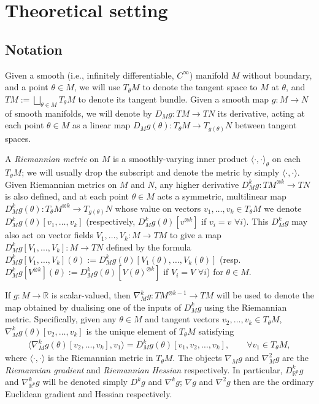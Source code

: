 \documentclass{article}
\newcommand{\RB}{\mathbb{R}}
\theoremstyle{plain}
\theoremstyle{definition}
\theoremstyle{remark}
\begin{document}
\section{Theoretical setting}

\subsection{Notation} 

Given a smooth (i.e., infinitely differentiable, $C^{\infty}$) manifold $M$ without boundary, and a point $\theta\in M$, we will use $T_{\theta}M$ to denote the tangent space to $M$ at $\theta$, and $TM:=\bigsqcup_{\theta\in M}T_{\theta}M$ to denote its tangent bundle. Given a smooth map $g:M\rightarrow N$ of smooth manifolds, we will denote by $D_Mg:TM\rightarrow TN$ its derivative, acting at each point $\theta\in M$ as a linear map $D_Mg(\theta):T_{\theta}M\rightarrow T_{g(\theta)}N$ between tangent spaces.

A \emph{Riemannian metric} on $M$ is a smoothly-varying inner product $\langle\cdot,\cdot\rangle_{\theta}$ on each $T_{\theta}M$; we will usually drop the subscript and denote the metric by simply $\langle\cdot,\cdot\rangle$. Given Riemannian metrics on $M$ and $N$, any higher derivative $D^k_Mg:TM^{\otimes k}\rightarrow TN$ is also defined, and at each point $\theta\in M$ acts a symmetric, multilinear map $D^k_Mg(\theta):T_{\theta}M^{\otimes k}\rightarrow T_{g(\theta)}N$ whose value on vectors $v_1,\dots,v_k\in T_{\theta}M$ we denote $D^k_Mg(\theta)[v_1,\dots,v_k]$ (respectively, $D^k_Mg(\theta)[v^{\otimes k}]$ if $v_i=v\,\,\forall i$). This $D^k_Mg$ may also act on vector fields $V_1,\dots,V_k:M\rightarrow TM$ to give a map $D^k_Mg[V_1,\dots,V_k]:M\rightarrow TN$ defined by the formula $D^k_Mg[V_1,\dots,V_k](\theta):=D^k_Mg(\theta)[V_1(\theta),\dots,V_k(\theta)]$ (resp. $D^k_Mg[V^{\otimes k}](\theta):=D^k_Mg(\theta)[V(\theta)^{\otimes k}]$ if $V_i=V\,\,\forall i$) for $\theta\in M$.

If $g:M\rightarrow\RB$ is scalar-valued, then $\nabla^k_Mg:TM^{\otimes k-1}\rightarrow TM$ will be used to denote the map obtained by dualising one of the inputs of $D^k_Mg$ using the Riemannian metric. Specifically, given any $\theta\in M$ and tangent vectors $v_2,\dots,v_k\in T_{\theta}M$, $\nabla^k_Mg(\theta)[v_2,\dots,v_k]$ is the unique element of $T_{\theta}M$ satisfying
\begin{align}
    \langle \nabla^k_Mg(\theta)[v_2,\dots,v_k],v_1\rangle = D^k_Mg(\theta)[v_1,v_2,\dots,v_k],\qquad \forall v_1\in T_{\theta}M,\label{eq:dualise}
\end{align}
where $\langle\cdot,\cdot\rangle$ is the Riemannian metric in $T_{\theta}M$. The objects $\nabla_Mg$ and $\nabla^2_Mg$ are the \emph{Riemannian gradient} and \emph{Riemannian Hessian} respectively. In particular, $D^k_{\RB^p}g$ and $\nabla^k_{\RB^p}g$ will be denoted simply $D^kg$ and $\nabla^kg$; $\nabla g$ and $\nabla^2g$ then are the ordinary Euclidean gradient and Hessian respectively.
\end{document}

